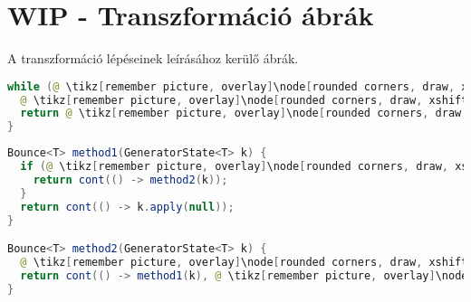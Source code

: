 \chapter*{WIP - Transzformáció ábrák}

A transzformáció lépéseinek leírásához kerülő ábrák.

\begin{center}
\begin{mdframed}[topline=true]
\begin{minipage}[t]{0.4\textwidth}
\begin{lstlisting}[language=Java, numbers=none, breaklines=true]
while (@ \tikz[remember picture, overlay]\node[rounded corners, draw, xshift=-0.1cm, inner sep=5pt, anchor=west, yshift=0.1cm] {Feltétel}; \vspace*{0.3cm} \hspace*{1.14cm}@) {
  @ \tikz[remember picture, overlay]\node[rounded corners, draw, xshift=-0.1cm, inner sep=5pt, anchor=west] {Kódrészlet}; \vspace*{0.5cm} @ 
  return @ \tikz[remember picture, overlay]\node[rounded corners, draw, xshift=-0.1cm, inner sep=5pt, anchor=west, yshift=0.1cm] {Kifejezés}; \vspace*{0.3cm} @
}
\end{lstlisting}
\end{minipage} 
\begin{minipage}[t]{0.6\textwidth}
\begin{lstlisting}[language=Java, numbers=none, breaklines=true]
Bounce<T> method1(GeneratorState<T> k) {
  if (@ \tikz[remember picture, overlay]\node[rounded corners, draw, xshift=-0.1cm, inner sep=5pt, anchor=west, yshift=0.1cm] {Feltétel}; \hspace*{1.04cm} @) {
    return cont(() -> method2(k));
  }
  return cont(() -> k.apply(null));
}

Bounce<T> method2(GeneratorState<T> k) {
  @ \tikz[remember picture, overlay]\node[rounded corners, draw, xshift=-0.1cm, inner sep=5pt, anchor=west] {Kódrészlet}; \vspace*{0.3cm} @
  return cont(() -> method1(k), @ \tikz[remember picture, overlay]\node[rounded corners, draw, xshift=-0.1cm, inner sep=5pt, anchor=west, yshift=0.1cm] {Kifejezés}; \vspace*{0.2cm} \hspace*{1.2cm} @);
}
\end{lstlisting} 
\end{minipage}
\end{mdframed}
\end{center}

